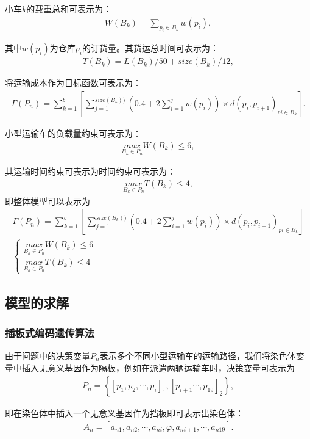 \documentclass{whutmod}
\begin{document}
小车$k$的载重总和可表示为：
\begin{gather}
W (B_k)=\sum_{p_i\in B_k}w(p_{i}),
\end{gather}

其中$w(p_{i})$为仓库$p_{i}$的订货量。其货运总时间可表示为：
\begin{gather}
T (B_k)=L(B_k)/50+size(B_k)/12,
\end{gather}

将运输成本作为目标函数可表示为：
\begin{gather*}
\Gamma (P_n)=\sum _{k=1}^b[\sum _{j=1}^{size(B_k))}(0.4+2\sum _{i=1}^jw(p_i))\times d(p_i,p_{i+1})_{pi\in B_k}].
\end{gather*}

小型运输车的负载量约束可表示为：
\begin{gather*}
\underset{B_k\in P_n}{max}  W (B_k) \leqslant 6,
\end{gather*}

其运输时间约束可表示为时间约束可表示为：
\begin{gather*}
\underset{B_k\in P_n}{max}  T (B_k) \leqslant 4,
\end{gather*}
即整体模型可以表示为
\begin{gather}
\Gamma (P_n)=\sum _{k=1}^b[\sum _{j=1}^{size(B_k))}(0.4+2\sum _{i=1}^jw(p_i))\times d(p_i,p_{i+1})_{pi\in B_k}]\\
\left\{\begin{matrix}\underset{B_k\in P_n}{max}  W (B_k) \leqslant 6
\\ \underset{B_k\in P_n}{max}  T (B_k) \leqslant 4
\end{matrix}\right.
\end{gather}
\subsection{模型的求解}
\subsubsection{插板式编码遗传算法}
由于问题中的决策变量$P_n$表示多个不同小型运输车的运输路径，我们将染色体变量中插入无意义基因作为隔板，例如在派遣两辆运输车时，决策变量可表示为
\begin{gather*}
P_n=\left \{[p_{1},p_{2},\cdots,p_{i}]_1,[p_{i+1}\cdots,p_{19}]_{2}\right \},
\end{gather*}

即在染色体中插入一个无意义基因作为挡板即可表示出染色体：
\begin{gather*}
A_n=[a_{n1},a_{n2},\cdots,a_{ni},\varphi ,a_{ni+1},\cdots,a_{n19}].
\end{gather*}
\end{document}
